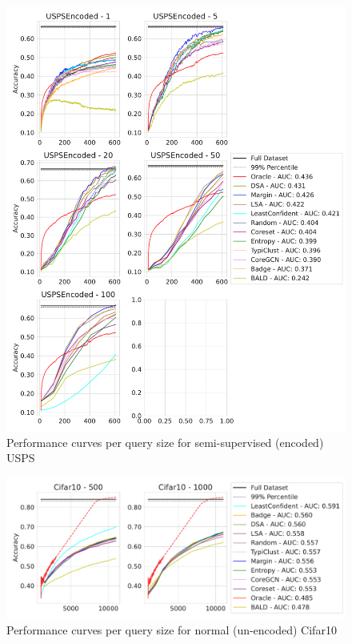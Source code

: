 \documentclass[]{article}
\begin{document}
\begin{figure}[H]
	\centering
	\caption{Performance curves per query size for semi-supervised (encoded) USPS}
	\includegraphics[width=\linewidth]{img/eval_usps_enc}
\end{figure}
\begin{figure}[H]
	\centering
	\caption{Performance curves per query size for normal (un-encoded) Cifar10}
	\includegraphics[width=\linewidth]{img/eval_cifar10}
\end{figure}
\end{document}
